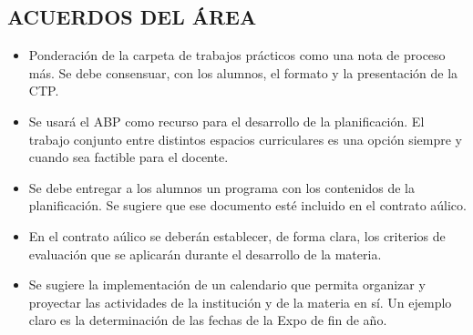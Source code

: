 \documentclass[a4paper]{article}
\begin{document}
\subsection*{ACUERDOS DEL ÁREA}
\begin{itemize}
    \item Ponderación de la carpeta de trabajos prácticos como una nota de proceso más. Se debe consensuar, con los alumnos, el formato y la presentación de la CTP.
    \item Se usará el ABP como recurso para el desarrollo de la planificación. El trabajo conjunto entre distintos espacios curriculares es una opción siempre y cuando sea factible para el docente. 
    \item Se debe entregar a los alumnos un programa con los contenidos de la planificación. Se sugiere que ese documento esté incluido en el contrato aúlico.
    \item En el contrato aúlico se deberán establecer, de forma clara, los criterios de evaluación que se aplicarán durante el desarrollo de la materia. 
    \item Se sugiere la implementación de un calendario que permita organizar y proyectar las actividades de la institución y de la materia en sí. Un ejemplo claro es la determinación de las fechas de la Expo de fin de año. 
\end{itemize}
\end{document}
